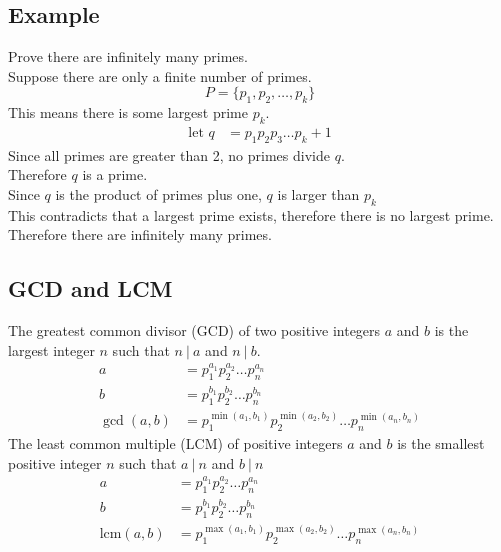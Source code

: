 \documentclass{article}
\theoremstyle{mytheoremstyle}
\theoremstyle{mytheoremstyle}
\theoremstyle{myproblemstyle}
\newcommand{\lcm}{\text{lcm}}
\begin{document}
    \subsection*{Example}
    Prove there are infinitely many primes. \\
    Suppose there are only a finite number of primes.
    \[
        P = \{p_1,p_2,\dots,p_k\}
    \]
    This means there is some largest prime $p_k$.
    \begin{align*}
        \text{let } q &= p_1p_2p_3\dots p_k + 1
    \end{align*}
    Since all primes are greater than 2, no primes divide $q$. \\
    Therefore $q$ is a prime. \\
    Since $q$ is the product of primes plus one, $q$ is larger than $p_k$ \\
    This contradicts that a largest prime exists, therefore there is no largest
    prime. \\
    Therefore there are infinitely many primes.

    \subsection*{GCD and LCM}
    The greatest common divisor (GCD) of two positive integers $a$ and $b$ is
    the largest integer $n$ such that $n\ |\ a$ and $n\ |\ b$.
    \begin{align*}
        a &= p_1^{a_1}p_2^{a_2}\dots p_n^{a_n} \\
        b &= p_1^{b_1}p_2^{b_2}\dots p_n^{b_n} \\
        \gcd(a,b) &= p_1^{\min(a_1,b_1)} p_2^{\min(a_2,b_2)} \dots p_n^{\min(a_n,b_n)}
    \end{align*}
    The least common multiple (LCM) of positive integers $a$ and $b$ is the
    smallest positive integer $n$ such that $a\ |\ n$ and $b\ |\ n$
    \begin{align*}
        a &= p_1^{a_1}p_2^{a_2}\dots p_n^{a_n} \\
        b &= p_1^{b_1}p_2^{b_2}\dots p_n^{b_n} \\
        \lcm(a,b) &= p_1^{\max(a_1,b_1)} p_2^{\max(a_2,b_2)} \dots p_n^{\max(a_n,b_n)}
    \end{align*}
\end{document}
